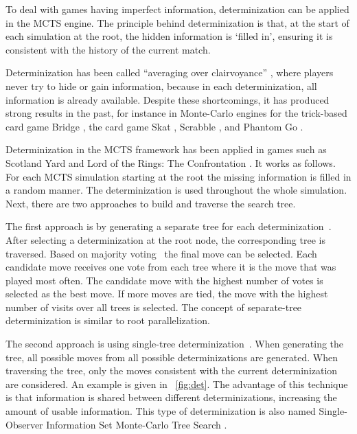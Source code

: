 \documentclass[a4paper]{llncs}
\begin{document}
To deal with games having imperfect information, determinization can be applied in the MCTS engine. The principle behind determinization is that, at the start of each simulation at the root, the hidden information is `filled in', ensuring it is consistent with the history of the current match. 

Determinization has been called ``averaging over clairvoyance'' \cite{russell10}, where players never try to hide or gain information, because in each determinization, all information is already available. Despite these  shortcomings, it has produced strong results in the past, for instance in Monte-Carlo engines for the trick-based card game  Bridge \cite{ginsberg99}, the card game Skat \cite{conf/ijcai/BuroLFS09}, Scrabble \cite{sheppard02}, and Phantom Go \cite{cazenave06}. 

Determinization in the MCTS framework has been applied in games such as Scotland Yard \cite{nijssen12tciaig} and Lord of the Rings: The Confrontation \cite{cowling2012}. It works as follows. For each MCTS simulation starting at the root the missing information is filled in a random manner. The determinization is used throughout the whole simulation. Next, there are two approaches to build and traverse the search tree. 

The first approach is by generating a separate tree for each determinization~\cite{cowling2012}. After selecting a determinization at the root node, the corresponding tree is traversed. Based on majority voting~\cite{nijssen12tciaig} the final move can be selected. Each candidate move receives one vote from each tree where it is the move that was played most often. The candidate move with the highest number of votes is selected as the best move. If more moves are tied, the move with the highest number of visits over all trees is selected. The concept of separate-tree determinization is similar to root parallelization.

The second approach is using single-tree determinization~\cite{ciancarini10,cowling2012,nijssen12tciaig}. When generating the tree, all possible moves from all possible determinizations are generated. When traversing the tree, only the moves consistent with the current determinization are considered. An example is given in \figurename~\ref{fig:det}. The advantage of this technique is that information is shared between different determinizations, increasing the amount of usable information. This type of determinization is also named Single-Observer Information Set Monte-Carlo Tree Search \cite{cowling2012}.
\end{document}
